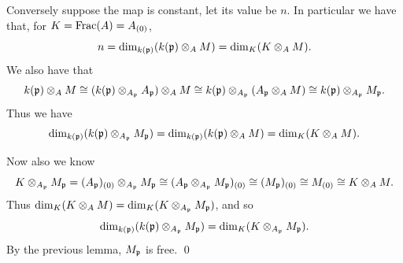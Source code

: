     Conversely suppose the map is constant, let its value be $n$.
    In particular we have that, for $K={\rm Frac}(A)=A_{(0)}$,
    $$ n = \dim_{k({{\frak p}})}(k({{\frak p}})\otimes_AM) = \dim_K(K\otimes_AM) . $$
    We also have that
    $$ k({{\frak p}})\otimes_AM \cong (k({{\frak p}})\otimes_{A_{{\frak p}}}A_{{\frak p}})\otimes_AM \cong k({{\frak p}}) \otimes_{A_{{\frak p}}} (A_{{\frak p}}\otimes_AM) \cong k({{\frak p}}) \otimes_{A_{{\frak p}}} M_{{\frak p}} . $$
    Thus we have
    $$ \dim_{k({{\frak p}})}(k({{\frak p}})\otimes_{A_{{\frak p}}}M_{{\frak p}}) = \dim_{k({{\frak p}})}(k({{\frak p}})\otimes_AM) = \dim_K(K\otimes_AM) . $$

    Now also we know
    $$ K\otimes_{A_{{\frak p}}}M_{{\frak p}} = (A_{{\frak p}})_{(0)} \otimes_{A_{{\frak p}}} M_{{\frak p}} \cong (A_{{\frak p}}\otimes_{A_{{\frak p}}}M_{{\frak p}})_{(0)} \cong (M_{{\frak p}})_{(0)} \cong M_{(0)} \cong K\otimes_AM . $$
    Thus $\dim_K(K\otimes_AM)=\dim_K(K\otimes_{A_{{\frak p}}}M_{{\frak p}})$, and so
    $$ \dim_{k({{\frak p}})}(k({{\frak p}})\otimes_{A_{{\frak p}}}M_{{\frak p}}) = \dim_K(K\otimes_{A_{{\frak p}}}M_{{\frak p}}) . $$
    By the previous lemma, $M_{{\frak p}}$ is free.
    \qed

\eproof

